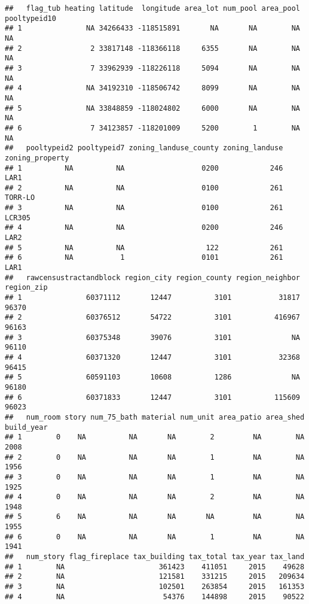 \documentclass[
]{article}
\begin{document}
\begin{verbatim}
##   flag_tub heating latitude  longitude area_lot num_pool area_pool pooltypeid10
## 1               NA 34266433 -118515891       NA       NA        NA           NA
## 2                2 33817148 -118366118     6355       NA        NA           NA
## 3                7 33962939 -118226118     5094       NA        NA           NA
## 4               NA 34192310 -118506742     8099       NA        NA           NA
## 5               NA 33848859 -118024802     6000       NA        NA           NA
## 6                7 34123857 -118201009     5200        1        NA           NA
##   pooltypeid2 pooltypeid7 zoning_landuse_county zoning_landuse zoning_property
## 1          NA          NA                  0200            246            LAR1
## 2          NA          NA                  0100            261         TORR-LO
## 3          NA          NA                  0100            261          LCR305
## 4          NA          NA                  0200            246            LAR2
## 5          NA          NA                   122            261                
## 6          NA           1                  0101            261            LAR1
##   rawcensustractandblock region_city region_county region_neighbor region_zip
## 1               60371112       12447          3101           31817      96370
## 2               60376512       54722          3101          416967      96163
## 3               60375348       39076          3101              NA      96110
## 4               60371320       12447          3101           32368      96415
## 5               60591103       10608          1286              NA      96180
## 6               60371833       12447          3101          115609      96023
##   num_room story num_75_bath material num_unit area_patio area_shed build_year
## 1        0    NA          NA       NA        2         NA        NA       2008
## 2        0    NA          NA       NA        1         NA        NA       1956
## 3        0    NA          NA       NA        1         NA        NA       1925
## 4        0    NA          NA       NA        2         NA        NA       1948
## 5        6    NA          NA       NA       NA         NA        NA       1955
## 6        0    NA          NA       NA        1         NA        NA       1941
##   num_story flag_fireplace tax_building tax_total tax_year tax_land
## 1        NA                      361423    411051     2015    49628
## 2        NA                      121581    331215     2015   209634
## 3        NA                      102501    263854     2015   161353
## 4        NA                       54376    144898     2015    90522

\end{verbatim}
\end{document}

